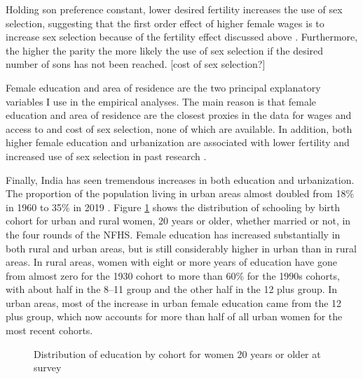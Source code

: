 Holding son preference constant, lower desired fertility increases the use of sex 
selection, suggesting that the first order effect of higher female wages is to increase 
sex selection because of the fertility effect discussed above 
\citep{Portner2015b,Jayachandran2017}.  
Furthermore, the higher the parity the more likely the use of sex selection if the 
desired number of sons has not been reached.
[cost of sex selection?]


Female education and area of residence are the two principal explanatory variables I use
in the empirical analyses.
The main reason is that female education and area of residence are the closest proxies in 
the data for wages and access to and cost of sex selection, none of which are available.
In addition, both higher female education and urbanization are associated with lower 
fertility and increased use of sex selection in past research
\citep{das_gupta97,dreze01,bhat03,retherford03b,Guilmoto2009a,Portner2015b,Jayachandran2017}.

Finally, India has seen tremendous increases in both education and urbanization.
The proportion of the population living in urban areas almost doubled from 18\%
in 1960 to 35\% in 2019 \citep{United-Nations2019}.
Figure \ref{fig:education_over_time} shows the distribution of schooling by birth 
cohort for urban and rural women, 20 years or older, whether married or not, in the 
four rounds of the NFHS.
Female education has increased substantially in both rural and urban areas,
but is still considerably higher in urban than in rural areas.
In rural areas, women with eight or more years of education have gone from almost zero for 
the 1930 cohort to more than 60\% for the 1990s cohorts, with about half in the 8--11 
group and the other half in the 12 plus group.
In urban areas, most of the increase in urban female education came from the 12 plus 
group, which now accounts for more than half of all urban women for the most recent cohorts.

\begin{figure}[htpb]
\centering
{} 
\caption{Distribution of education by cohort for women 20 years or older at survey}
\label{fig:education_over_time}
\end{figure}



